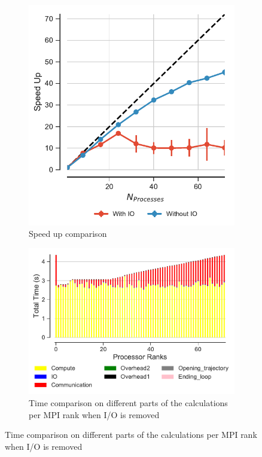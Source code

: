  \begin{figure}[ht!]
\centering
\begin{subfigure}{.35\textwidth}
  \includegraphics[width=\linewidth]{figures/speed_up-effect-of-IO.pdf}
  \caption{Speed up comparison}
  \label{fig:MPIspeedup-no-IO}
\end{subfigure}
\hfill
\begin{subfigure}{.45\textwidth}
  \includegraphics[width=\linewidth]{figures/BarPlot-rank-comparison-no-IO.pdf}
  \captionsetup{format=hang}
  \caption{Time comparison on different parts of the calculations per MPI rank when I/O is removed}
  \label{fig:MPIranks-no-IO}
\end{subfigure}


\end{figure}
